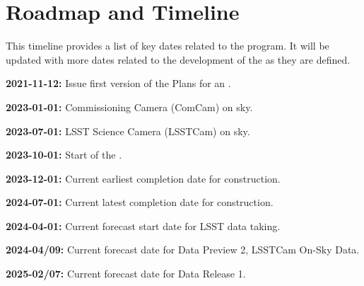 \section{Roadmap and Timeline} \label{sec:timeline}

This timeline provides a list of key dates  related to the \es program. 
It will be updated with more dates related to the development of the \esp as they are defined. 

\textbf{2021-11-12:} Issue first version of the \ro Plans for an \esp. 

\textbf{2023-01-01:} Commissioning Camera (ComCam) on sky.

\textbf{2023-07-01:} LSST Science Camera (LSSTCam) on sky.

\textbf{2023-10-01:} Start of the \svs.

\textbf{2023-12-01:} Current earliest completion date for construction.

\textbf{2024-07-01:} Current latest completion date for construction.

\textbf{2024-04-01:} Current forecast start date for LSST data taking.

\textbf{2024-04/09:} Current forecast date for Data Preview 2, LSSTCam On-Sky Data.

\textbf{2025-02/07:} Current forecast date for Data Release 1.